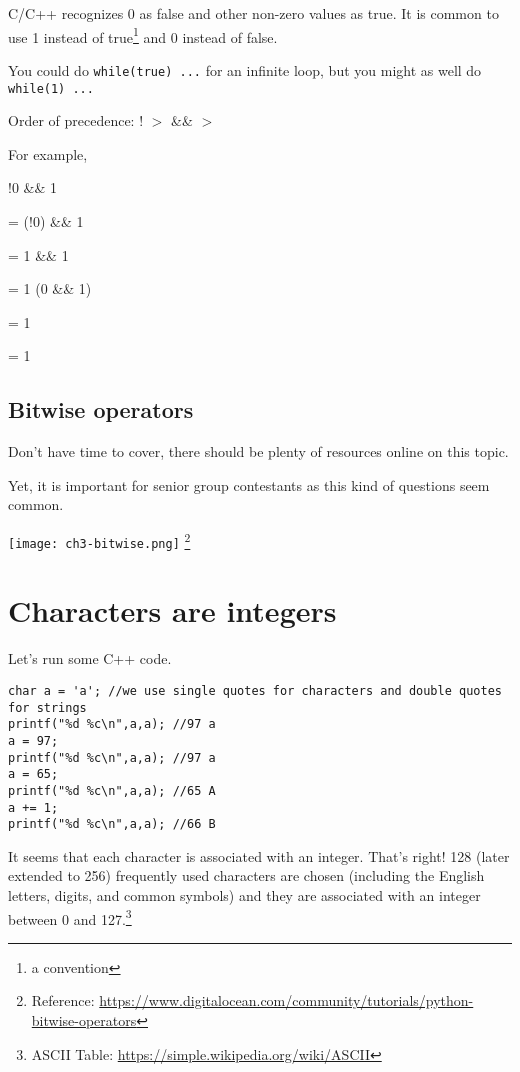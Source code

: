 C/C++ recognizes 0 as false and other non-zero values as true. It is common to use 1 instead of true\footnote{a convention} and 0 instead of false.

You could do \texttt{while(true) ...} for an infinite loop, but you might as well do \texttt{while(1) ...}
\vspace{6mm}

Order of precedence: ! $>$ \&\& $>$ \textbar\textbar

For example, 

!0 \textbar{} \&\& 1

= (!0) \textbar{} \&\& 1

= 1 \textbar{} \&\& 1

= 1 \textbar\textbar (0 \&\& 1)

= 1 \textbar{}

= 1

\subsection{Bitwise operators}

Don't have time to cover, there should be plenty of resources online on this topic. 

Yet, it is important for senior group contestants as this kind of questions seem common. 

\texttt{[image: ch3-bitwise.png]}
\footnote{Reference: \href{https://www.digitalocean.com/community/tutorials/python-bitwise-operators}{https://www.digitalocean.com/community/tutorials/python-bitwise-operators}}

\section{Characters are integers}

Let's run some C++ code.

\begin{lstlisting}
char a = 'a'; //we use single quotes for characters and double quotes for strings
printf("%d %c\n",a,a); //97 a
a = 97;
printf("%d %c\n",a,a); //97 a
a = 65;
printf("%d %c\n",a,a); //65 A
a += 1;
printf("%d %c\n",a,a); //66 B
\end{lstlisting}

It seems that each character is associated with an integer. That's right! 128 (later extended to 256) frequently used characters are chosen (including the English letters, digits, and common symbols) and they are associated with an integer between 0 and 127.\footnote{ASCII Table: \href{https://simple.wikipedia.org/wiki/ASCII}{https://simple.wikipedia.org/wiki/ASCII}}

